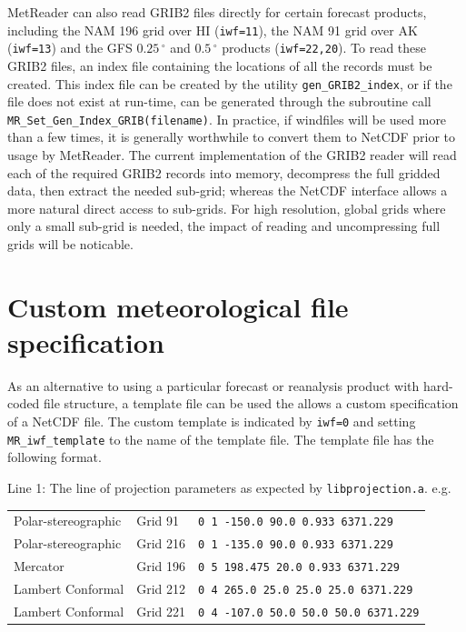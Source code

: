 \documentclass[11pt]{article}   %
\begin{document}
MetReader can also read GRIB2 files directly for certain forecast products, including the
NAM 196 grid over HI (\texttt{iwf=11}), the NAM 91 grid over AK
(\texttt{iwf=13}) and the GFS $0.25 \, ^{\circ}$ and $0.5 \, ^{\circ}$
products (\texttt{iwf=22,20}).  To read these GRIB2 files, an index
file containing the locations of all the records must be created.
This index file can be created 
by the utility \texttt{gen\_GRIB2\_index}, or if the file does not exist at
run-time, can be generated through the subroutine call
\texttt{MR\_Set\_Gen\_Index\_GRIB(filename)}.  In practice, if windfiles will be used
more than a few times, it is generally worthwhile to convert them to NetCDF prior
to usage by MetReader.  The current
implementation of the GRIB2 reader will read each of the required GRIB2 records into
memory, decompress the full gridded data, then extract the needed sub-grid; whereas the 
NetCDF interface allows a more natural direct access to sub-grids.  For high resolution,
global grids where only a small sub-grid is needed, the impact of reading and uncompressing
full grids will be noticable.

\section{Custom meteorological file specification}\label{SecCust}
As an alternative to using a particular forecast or reanalysis product with
hard-coded file structure, a template file can be used the allows a custom
specification of a NetCDF file.
The custom template is indicated by \texttt{iwf=0} and setting \texttt{MR\_iwf\_template}
to the name of the template file.  The template file has the following format.

Line 1: The line of projection parameters as expected by \texttt{libprojection.a}.
e.g.
\\
\begin{tabular}{ l  l  l }
Polar-stereographic & Grid 91  & \verb|0 1 -150.0 90.0 0.933 6371.229| \\
Polar-stereographic & Grid 216 & \verb|0 1 -135.0 90.0 0.933 6371.229| \\
Mercator            & Grid 196 & \verb|0 5 198.475 20.0 0.933 6371.229| \\
Lambert Conformal   & Grid 212 & \verb|0 4 265.0 25.0 25.0 25.0 6371.229| \\
Lambert Conformal   & Grid 221 & \verb|0 4 -107.0 50.0 50.0 50.0 6371.229| \\
\end{tabular}
\end{document}
